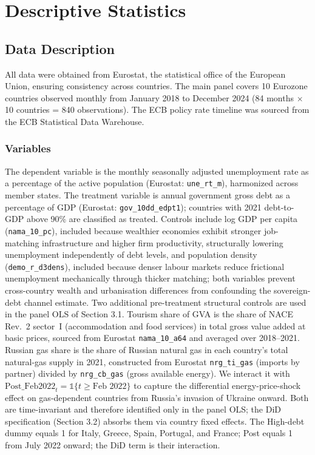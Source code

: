 \documentclass[11pt,a4paper]{article}
\begin{document}
\section{Descriptive Statistics}

\subsection{Data Description}

All data were obtained from Eurostat, the statistical office of the European Union, ensuring consistency across countries. The main panel covers 10 Eurozone countries observed monthly from January 2018 to December 2024 (84 months $\times$ 10 countries = 840 observations). The ECB policy rate timeline was sourced from the ECB Statistical Data Warehouse.

\subsubsection{Variables}
The dependent variable is the monthly seasonally adjusted unemployment rate as a percentage
of the active population (Eurostat: \texttt{une\_rt\_m}), harmonized across member states.
The treatment variable is annual government gross debt as a percentage of GDP (Eurostat:
\texttt{gov\_10dd\_edpt1}); countries with 2021 debt-to-GDP above 90\% are classified as
treated. Controls include log GDP per capita (\texttt{nama\_10\_pc}), included because wealthier economies exhibit stronger job-matching infrastructure and higher firm productivity, structurally lowering unemployment independently of debt levels, and population density (\texttt{demo\_r\_d3dens}), included because denser labour markets reduce frictional unemployment mechanically through thicker matching; both variables prevent cross-country wealth and urbanisation differences from confounding the sovereign-debt channel estimate. Two additional pre-treatment structural controls are used in the panel OLS of Section 3.1. Tourism share of GVA is the share of NACE Rev.~2 sector~I (accommodation and food services) in total gross value added at basic prices, sourced from Eurostat \texttt{nama\_10\_a64} and averaged over 2018--2021. Russian gas share is the share of Russian natural gas in each country's total natural-gas supply in 2021, constructed from Eurostat \texttt{nrg\_ti\_gas} (imports by partner) divided by \texttt{nrg\_cb\_gas} (gross available energy). We interact it with $\text{Post\_Feb2022}_t = \mathbb{1}\{t \ge \text{Feb 2022}\}$ to capture the differential energy-price-shock effect on gas-dependent countries from Russia's invasion of Ukraine onward. Both are time-invariant and therefore identified only in the panel OLS; the DiD specification (Section 3.2) absorbs them via country fixed effects.
The High-debt dummy equals 1 for Italy, Greece, Spain, Portugal, and France; Post equals 1 from July 2022 onward; the DiD term is their interaction.
\end{document}
